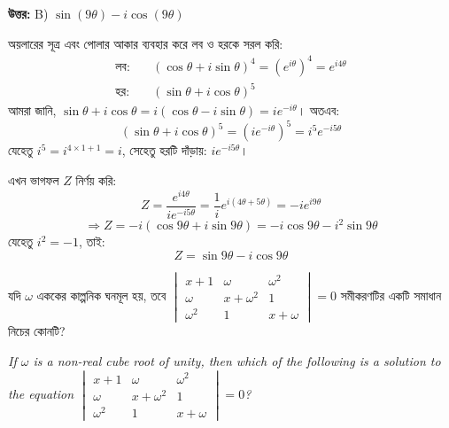 \documentclass[12pt, a4paper]{article}
\begin{document}
\vspace{0.5em}
\begin{tcolorbox}[answerbox]
    \textbf{\color{success} উত্তর:} B) $\sin(9\theta) - i\cos(9\theta)$
\end{tcolorbox}
\vspace{1em}

\begin{tcolorbox}[solutionbox={সমাধান (Solution)}]
    \noindent
    অয়লারের সূত্র এবং পোলার আকার ব্যবহার করে লব ও হরকে সরল করি:
    \begin{align*}
        \text{লব:} &\quad (\cos\theta + i\sin\theta)^4 = (e^{i\theta})^4 = e^{i 4\theta} \\
        \text{হর:} &\quad (\sin\theta + i\cos\theta)^5
    \end{align*}
    আমরা জানি, $\sin\theta + i\cos\theta = i(\cos\theta - i\sin\theta) = i e^{-i\theta}$। অতএব:
    \[ (\sin\theta + i\cos\theta)^5 = (i e^{-i\theta})^5 = i^5 e^{-i 5\theta} \]
    যেহেতু $i^5 = i^{4 \times 1 + 1} = i$, সেহেতু হরটি দাঁড়ায়: $i e^{-i 5\theta}$।
    
    \vspace{0.5em}
    এখন ভাগফল $Z$ নির্ণয় করি:
    \[ Z = \frac{e^{i 4\theta}}{i e^{-i 5\theta}} = \frac{1}{i} e^{i(4\theta + 5\theta)} = -i e^{i 9\theta} \]
    \[ \Rightarrow Z = -i(\cos 9\theta + i\sin 9\theta) = -i\cos 9\theta - i^2\sin 9\theta \]
    যেহেতু $i^2 = -1$, তাই:
    \[ Z = \sin 9\theta - i\cos 9\theta \]
\end{tcolorbox}
\begin{tcolorbox}[questionbox={প্রশ্ন (Question) 18}]
    \noindent
    যদি $\omega$ এককের কাল্পনিক ঘনমূল হয়, তবে $\begin{vmatrix} x+1 & \omega & \omega^2 \\ \omega & x+\omega^2 & 1 \\ \omega^2 & 1 & x+\omega \end{vmatrix} = 0$ সমীকরণটির একটি সমাধান নিচের কোনটি?
    
    \vspace{0.8em}
    \begin{english}
    \noindent\textit{\color{darkgray}
    If $\omega$ is a non-real cube root of unity, then which of the following is a solution to the equation $\begin{vmatrix} x+1 & \omega & \omega^2 \\ \omega & x+\omega^2 & 1 \\ \omega^2 & 1 & x+\omega \end{vmatrix} = 0$?
    }
    \end{english}
\end{tcolorbox}
\end{document}
